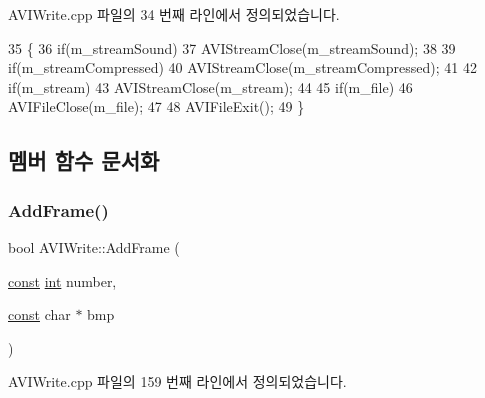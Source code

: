 A\+V\+I\+Write.\+cpp 파일의 34 번째 라인에서 정의되었습니다.


\begin{DoxyCode}
35 \{
36   \textcolor{keywordflow}{if}(m\_streamSound)
37     AVIStreamClose(m\_streamSound);
38 
39   \textcolor{keywordflow}{if}(m\_streamCompressed)
40     AVIStreamClose(m\_streamCompressed);
41   
42   \textcolor{keywordflow}{if}(m\_stream)
43     AVIStreamClose(m\_stream);
44 
45   \textcolor{keywordflow}{if}(m\_file)
46     AVIFileClose(m\_file);
47 
48   AVIFileExit();
49 \}
\end{DoxyCode}


\subsection{멤버 함수 문서화}
\mbox{\label{class_a_v_i_write_a904b7f02ff6ecfeeaeec6e1c82f1592a}} 
\subsubsection{\texorpdfstring{Add\+Frame()}{AddFrame()}}
{\footnotesize\ttfamily bool A\+V\+I\+Write\+::\+Add\+Frame (\begin{DoxyParamCaption}\item[{\mbox{\hyperlink{getopt1_8c_a2c212835823e3c54a8ab6d95c652660e}{const}} \mbox{\hyperlink{_util_8cpp_a0ef32aa8672df19503a49fab2d0c8071}{int}}}]{number,  }\item[{\mbox{\hyperlink{getopt1_8c_a2c212835823e3c54a8ab6d95c652660e}{const}} char $\ast$}]{bmp }\end{DoxyParamCaption})\hspace{0.3cm}{\ttfamily [virtual]}}



A\+V\+I\+Write.\+cpp 파일의 159 번째 라인에서 정의되었습니다.


